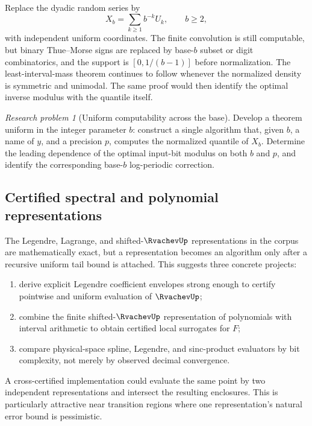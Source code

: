 \documentclass[11pt,oneside]{article}
\theoremstyle{definition}
\theoremstyle{remark}
\numberwithin{equation}{section}
\newtheorem{problem}[theorem]{Research problem}
\begin{document}
Replace the dyadic random series by
\[
 X_b=\sum_{k\ge1}b^{-k}U_k,
 \qquad b\ge2,
\]
with independent uniform coordinates.  The finite convolution is still
computable, but binary Thue--Morse signs are replaced by base-$b$ subset or
digit combinatorics, and the support is $[0,1/(b-1)]$ before normalization.
The least-interval-mass theorem continues to follow whenever the normalized
density is symmetric and unimodal.  The same proof would then identify the
optimal inverse modulus with the quantile itself.

\begin{problem}[Uniform computability across the base]
Develop a theorem uniform in the integer parameter $b$: construct a single
algorithm that, given $b$, a name of $y$, and a precision $p$, computes the
normalized quantile of $X_b$.  Determine the leading dependence of the
optimal input-bit modulus on both $b$ and $p$, and identify the corresponding
base-$b$ log-periodic correction.
\end{problem}

\subsection{Certified spectral and polynomial representations}

The Legendre, Lagrange, and shifted-$\RvachevUp$ representations in the corpus are
mathematically exact, but a representation becomes an algorithm only after a
recursive uniform tail bound is attached.  This suggests three concrete
projects:

\begin{enumerate}
\item derive explicit Legendre coefficient envelopes strong enough to certify
      pointwise and uniform evaluation of $\RvachevUp$;
\item combine the finite shifted-$\RvachevUp$ representation of polynomials with
      interval arithmetic to obtain certified local surrogates for $F$;
\item compare physical-space spline, Legendre, and sinc-product evaluators by
      bit complexity, not merely by observed decimal convergence.
\end{enumerate}

A cross-certified implementation could evaluate the same point by two
independent representations and intersect the resulting enclosures.  This is
particularly attractive near transition regions where one representation's
natural error bound is pessimistic.
\end{document}
